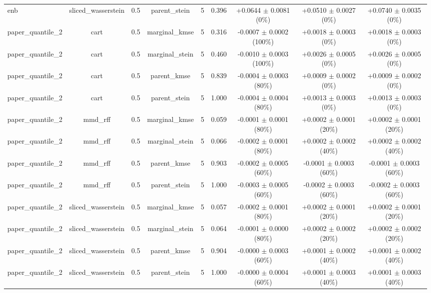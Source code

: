 \begin{table}[h]
\begin{adjustbox}{max width=\textwidth}
\begin{tabular}{lcccccccc}
    enb & sliced\_wasserstein & 0.5 & parent\_stein & 5 & 0.396 & +0.0644 $\pm$ 0.0081 (0\%) & +0.0510 $\pm$ 0.0027 (0\%) & +0.0740 $\pm$ 0.0035 (0\%) \\
    paper\_quantile\_2 & cart & 0.5 & marginal\_kmse & 5 & 0.316 & -0.0007 $\pm$ 0.0002 (100\%) & +0.0018 $\pm$ 0.0003 (0\%) & +0.0018 $\pm$ 0.0003 (0\%) \\
    paper\_quantile\_2 & cart & 0.5 & marginal\_stein & 5 & 0.460 & -0.0010 $\pm$ 0.0003 (100\%) & +0.0026 $\pm$ 0.0005 (0\%) & +0.0026 $\pm$ 0.0005 (0\%) \\
    paper\_quantile\_2 & cart & 0.5 & parent\_kmse & 5 & 0.839 & -0.0004 $\pm$ 0.0003 (80\%) & +0.0009 $\pm$ 0.0002 (0\%) & +0.0009 $\pm$ 0.0002 (0\%) \\
    paper\_quantile\_2 & cart & 0.5 & parent\_stein & 5 & 1.000 & -0.0004 $\pm$ 0.0004 (80\%) & +0.0013 $\pm$ 0.0003 (0\%) & +0.0013 $\pm$ 0.0003 (0\%) \\
    paper\_quantile\_2 & mmd\_rff & 0.5 & marginal\_kmse & 5 & 0.059 & -0.0001 $\pm$ 0.0001 (80\%) & +0.0002 $\pm$ 0.0001 (20\%) & +0.0002 $\pm$ 0.0001 (20\%) \\
    paper\_quantile\_2 & mmd\_rff & 0.5 & marginal\_stein & 5 & 0.066 & -0.0002 $\pm$ 0.0001 (80\%) & +0.0002 $\pm$ 0.0002 (40\%) & +0.0002 $\pm$ 0.0002 (40\%) \\
    paper\_quantile\_2 & mmd\_rff & 0.5 & parent\_kmse & 5 & 0.903 & -0.0002 $\pm$ 0.0005 (60\%) & -0.0001 $\pm$ 0.0003 (60\%) & -0.0001 $\pm$ 0.0003 (60\%) \\
    paper\_quantile\_2 & mmd\_rff & 0.5 & parent\_stein & 5 & 1.000 & -0.0003 $\pm$ 0.0005 (60\%) & -0.0002 $\pm$ 0.0003 (60\%) & -0.0002 $\pm$ 0.0003 (60\%) \\
    paper\_quantile\_2 & sliced\_wasserstein & 0.5 & marginal\_kmse & 5 & 0.057 & -0.0002 $\pm$ 0.0001 (80\%) & +0.0002 $\pm$ 0.0001 (20\%) & +0.0002 $\pm$ 0.0001 (20\%) \\
    paper\_quantile\_2 & sliced\_wasserstein & 0.5 & marginal\_stein & 5 & 0.064 & -0.0001 $\pm$ 0.0000 (80\%) & +0.0002 $\pm$ 0.0002 (20\%) & +0.0002 $\pm$ 0.0002 (20\%) \\
    paper\_quantile\_2 & sliced\_wasserstein & 0.5 & parent\_kmse & 5 & 0.904 & -0.0000 $\pm$ 0.0003 (60\%) & +0.0001 $\pm$ 0.0002 (40\%) & +0.0001 $\pm$ 0.0002 (40\%) \\
    paper\_quantile\_2 & sliced\_wasserstein & 0.5 & parent\_stein & 5 & 1.000 & -0.0000 $\pm$ 0.0004 (60\%) & +0.0001 $\pm$ 0.0003 (40\%) & +0.0001 $\pm$ 0.0003 (40\%) \\

\end{tabular}
\end{adjustbox}
\end{table}
